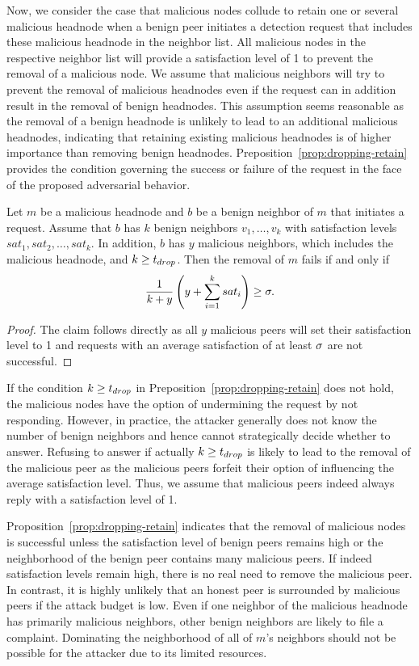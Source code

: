 Now, we consider the case that malicious nodes collude to retain one or several malicious headnode when a benign peer initiates a detection request that includes these malicious headnode in the neighbor list. 
All malicious nodes in the respective neighbor list will provide a satisfaction level of 1 to prevent the removal of a malicious node. We assume that malicious neighbors will try to prevent the removal of malicious headnodes even if the request can in addition result in the removal of benign headnodes. This assumption seems reasonable as the removal of a benign headnode is unlikely to lead to an additional malicious headnodes, indicating that retaining existing malicious headnodes is of higher importance than removing benign headnodes.  Preposition~\ref{prop:dropping-retain} provides the condition governing the success or failure of the \drop request in the face of the proposed adversarial behavior. 

\begin{proposition}
\label{prop:dropping-retain}
Let $m$ be a malicious headnode and $b$ be a benign neighbor of $m$ that initiates a \drop request.
Assume that $b$ has $k$ benign neighbors $v_1, \ldots , v_k$ with satisfaction levels $sat_1, sat_2 ,\ldots  , sat_k$. In addition, $b$ has $y$ malicious neighbors, which includes the malicious headnode, and $k\geq t_{drop}$.
 Then the removal of $m$ fails if and only if 
\begin{align}
\label{eq:drop-retain}
\frac{1}{k+y}\left(y+\sum_{i=1}^k sat_i\right) \geq \satThres.  
\end{align} 
\end{proposition}
\begin{proof}
The claim follows directly as all $y$ malicious peers will set their satisfaction level to 1 and \drop requests with an average satisfaction of at least $\sigma$ are not successful.   
\end{proof}
If the condition $k\geq t_{drop}$ in Preposition~\ref{prop:dropping-retain} does not hold, the malicious nodes have the option of undermining the request by not responding. However, in practice, the attacker generally does not know the number of benign neighbors and hence cannot strategically decide whether to answer. Refusing to answer if actually $k\geq t_{drop}$ is likely to lead to the removal of the malicious peer as the malicious peers forfeit their option of influencing the average satisfaction level. Thus, we assume that malicious peers indeed always reply with a satisfaction level of 1. 

Proposition~\ref{prop:dropping-retain} indicates that the removal of malicious nodes is successful unless the satisfaction level of benign peers remains high or the neighborhood of the benign peer contains many malicious peers. 
If indeed satisfaction levels remain high, there is no real need to remove the malicious peer. In contrast, it is highly unlikely that an honest peer is surrounded by malicious peers if the attack budget is low. Even if one neighbor of the malicious headnode has primarily malicious neighbors, other benign neighbors are likely to file a complaint. Dominating the neighborhood of all of $m$'s neighbors should not be possible for the attacker due to its limited resources.

 
 